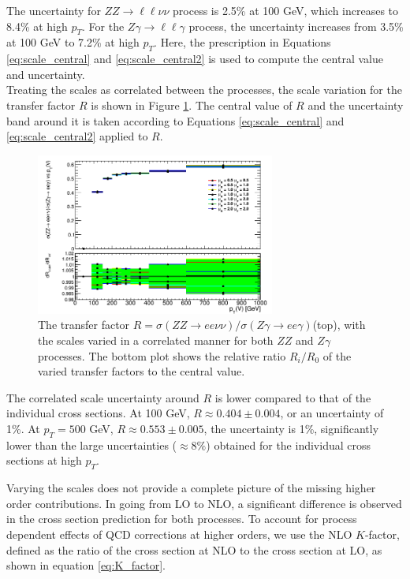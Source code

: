 \documentclass[12pt,a4paper,openright,twoside]{report}
\newcommand{\ZZ}{$ZZ\to \ell\ell\nu\nu$ }
\newcommand{\Zg}{$Z\gamma\to \ell\ell\gamma$ }
\begin{document}
The uncertainty for \ZZ process is 2.5\% at 100 GeV, which increases to 8.4\% at high $p_T$. For the \Zg process, the uncertainty increases from 3.5\% at 100 GeV to 7.2\% at high $p_T$. Here, the prescription in Equations \ref{eq:scale_central} and \ref{eq:scale_central2} is used to compute the central value and uncertainty.\\ Treating the scales as correlated between the processes, the scale variation for the transfer factor $R$ is shown in Figure \ref{fig:R_scale}. The central value of $R$ and the uncertainty band around it is taken according to Equations \ref{eq:scale_central} and \ref{eq:scale_central2} applied to $R$.
\begin{figure}[H]
\centering
\includegraphics[width=0.7\textwidth]{R_scale.png}
\caption{The transfer factor $R = \sigma(ZZ\to ee\nu\nu)/\sigma(Z\gamma\to ee\gamma)$(top), with the scales varied in a correlated manner for both $ZZ$ and $Z\gamma$ processes. The bottom plot shows the relative ratio $R_i/R_0$ of the varied transfer factors to the central value.}
\label{fig:R_scale}
\end{figure}
The correlated scale uncertainty around $R$ is lower compared to that of the individual cross sections. At 100 GeV, $R \approx 0.404 \pm 0.004$, or an uncertainty of 1\%. At $p_T = 500$ GeV, $R\approx 0.553 \pm 0.005$, the uncertainty is 1\%, significantly lower than the large uncertainties ($\approx 8\%$) obtained for the individual cross sections at high $p_T$.

Varying the scales does not provide a complete picture of the missing higher order contributions. In going from LO to NLO, a significant difference is observed in the cross section prediction for both processes. To account for process dependent effects of QCD corrections at higher orders, we use the NLO $K$-factor, defined as the ratio of the cross section at NLO to the cross section at LO, as shown in equation \ref{eq:K_factor}.
\end{document}
